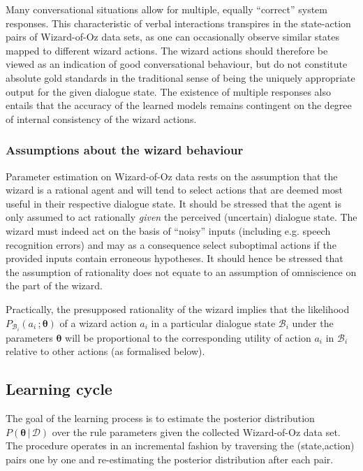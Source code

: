 
Many conversational situations allow for multiple, equally ``correct'' system responses.  This characteristic of verbal interactions transpires in the state-action pairs of Wizard-of-Oz data sets, as one can occasionally observe similar states mapped to different wizard actions. The wizard actions should therefore be viewed as an indication of good conversational behaviour, but do not constitute absolute gold standards in the traditional sense of being the uniquely appropriate output for the given dialogue state. The existence of multiple responses also entails that the accuracy of the learned models remains contingent on the degree of internal consistency of the wizard actions. 

\subsubsection*{Assumptions about the wizard behaviour}

Parameter estimation on Wizard-of-Oz data rests on the assumption that the wizard is a rational agent and will tend to select actions that are deemed most useful in their respective dialogue state. It should be stressed that the agent is only assumed to act rationally \textit{given} the perceived (uncertain) dialogue state. The wizard must indeed act on the basis of ``noisy'' inputs (including e.g. speech recognition errors) and may as a consequence select suboptimal actions if the provided inputs contain erroneous hypotheses. It should hence be stressed that the assumption of rationality does not equate to an assumption of omniscience on the part of the wizard. 

Practically, the presupposed rationality of the wizard implies that the likelihood $P_{\mathcal{B}_i}(a_i\,; \boldsymbol\theta)$ of a wizard action $a_i$ in a particular dialogue state $\mathcal{B}_i$ under the parameters $\boldsymbol\theta$ will be proportional to the corresponding utility of action $a_i$ in $\mathcal{B}_i$ relative to other actions (as formalised below).

\subsection{Learning cycle}
\label{sec:rule-supervised-learning}

The goal of the learning process is to estimate the posterior distribution $P(\boldsymbol\theta \, | \, \mathcal{D})$ over the rule parameters given the collected Wizard-of-Oz data set. The procedure operates in an incremental fashion by traversing the (state,action) pairs one by one and re-estimating the posterior distribution after each pair.  

